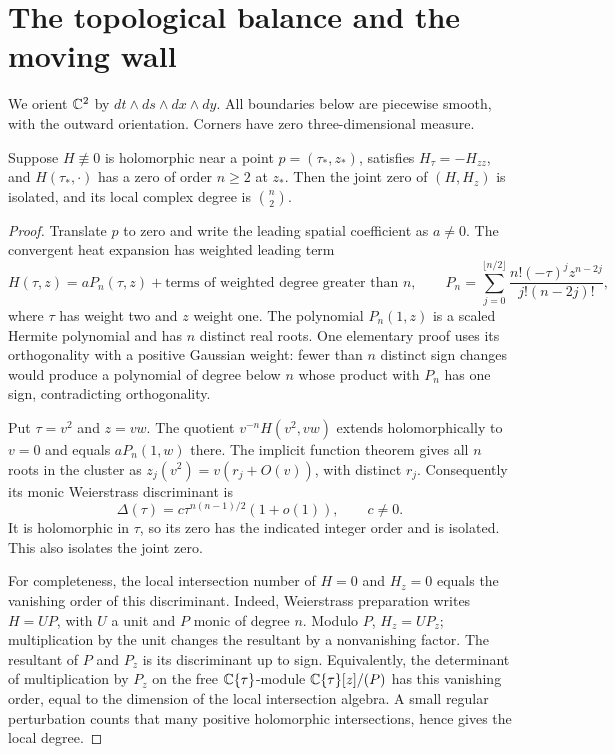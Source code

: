 \section{The topological balance and the moving wall}
\label{sec:boundary}

We orient $\mathbb C^2$ by $dt\wedge ds\wedge dx\wedge dy$.
All boundaries below are piecewise smooth, with the outward
orientation. Corners have zero three-dimensional measure.

\begin{lemma}
\label{lem:charge}
Suppose $H\not\equiv0$ is holomorphic near a point $p=(\tau_*,z_*)$,
satisfies $H_\tau=-H_{zz}$, and $H(\tau_*,\cdot)$ has a zero
of order $n\ge2$ at $z_*$. Then the joint zero of $(H,H_z)$ is
isolated, and its local complex degree is $\binom n2$.
\end{lemma}
\begin{proof}
Translate $p$ to zero and write the leading spatial coefficient as
$a\ne0$. The convergent heat expansion has weighted leading term
\[
 H(\tau,z)=aP_n(\tau,z)+\text{terms of weighted degree greater than }n,
 \qquad
 P_n=\sum_{j=0}^{\lfloor n/2\rfloor}
       \frac{n!(-\tau)^jz^{n-2j}}{j!(n-2j)!},
\]
where $\tau$ has weight two and $z$ weight one.
The polynomial $P_n(1,z)$ is a scaled Hermite polynomial and has
$n$ distinct real roots. One elementary proof uses its orthogonality
with a positive Gaussian weight: fewer than $n$ distinct sign changes
would produce a polynomial of degree below $n$ whose product with
$P_n$ has one sign, contradicting orthogonality.

Put $\tau=v^2$ and $z=vw$. The quotient $v^{-n}H(v^2,vw)$
extends holomorphically to $v=0$ and equals $aP_n(1,w)$ there.
The implicit function theorem gives all $n$ roots in the cluster as
$z_j(v^2)=v(r_j+O(v))$, with distinct $r_j$.
Consequently its monic Weierstrass discriminant is
\[
 \Delta(\tau)=c\tau^{n(n-1)/2}(1+o(1)),\qquad c\ne0.
\]
It is holomorphic in $\tau$, so its zero has the indicated integer
order and is isolated. This also isolates the joint zero.

For completeness, the local intersection number of $H=0$ and
$H_z=0$ equals the vanishing order of this discriminant. Indeed,
Weierstrass preparation writes $H=UP$, with $U$ a unit and $P$
monic of degree $n$. Modulo $P$, $H_z=UP_z$; multiplication by
the unit changes the resultant by a nonvanishing factor. The
resultant of $P$ and $P_z$ is its discriminant up to sign. Equivalently,
the determinant of multiplication by $P_z$ on the free
$\mathbb C\{\tau\}$-module $\mathbb C\{\tau\}[z]/(P)$ has this vanishing
order, equal to the dimension of the local intersection algebra.
A small regular perturbation counts that many positive holomorphic
intersections, hence gives the local degree.
\end{proof}

